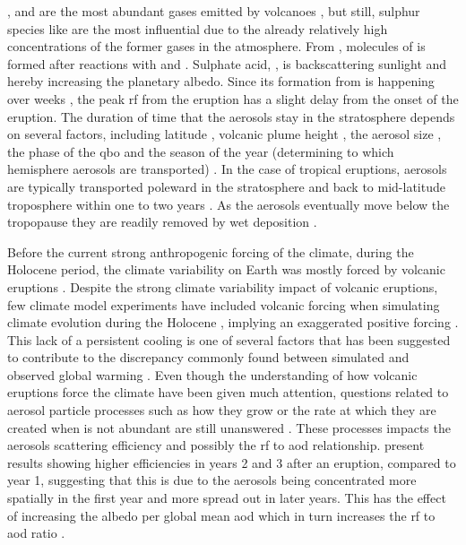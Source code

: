 \documentclass{ametsocV6.1}
\begin{document}
,  and  are the most abundant gases emitted by volcanoes
\citep{robock2000}, but still, sulphur species like  are the most influential
due to the already relatively high concentrations of the former gases in the atmosphere.
From , molecules of  is formed after reactions with  and
 \citep{robock2000}. Sulphate acid, , is backscattering sunlight and
hereby increasing the planetary albedo. Since its formation from  is happening
over weeks \citep{robock2000}, the peak \gls{rf} from the eruption has a slight delay
from the onset of the eruption. The duration of time that the  aerosols stay
in the stratosphere depends on several factors, including latitude \citep{marshall2019,
  toohey2019}, volcanic plume height \citep{marshall2019}, the aerosol size
\citep{marshall2019}, the phase of the \gls{qbo} \citep{pitari2016b} and the season of
the year (determining to which hemisphere aerosols are transported)
\citep{toohey2011,toohey2019}. In the case of tropical eruptions, aerosols are typically
transported poleward in the stratosphere and back to mid-latitude troposphere within one
to two years \citep{robock2000}. As the aerosols eventually move below the tropopause
they are readily removed by wet deposition \citep{liu2012}.

Before the current strong anthropogenic forcing of the climate, during the Holocene
period, the climate variability on Earth was mostly forced by volcanic eruptions
\citep{sigl2022}. Despite the strong climate variability impact of volcanic eruptions,
few climate model experiments have included volcanic forcing when simulating climate
evolution during the Holocene \citep{sigl2022}, implying an exaggerated positive forcing
\citep{gregory2016,solomon2011}. This lack of a persistent cooling is one of several
factors that has been suggested to contribute to the discrepancy commonly found between
simulated and observed global warming \citep{andersson2015}. Even though the
understanding of how volcanic eruptions force the climate have been given much
attention, questions related to aerosol particle processes such as how they grow or the
rate at which they are created when  is not abundant are still unanswered
\citep[e.g.][]{robock2000,zanchettin2019,marshall2020,marshall2022}. These processes
impacts the aerosols scattering efficiency and possibly the \gls{rf} to \gls{aod}
relationship. \citet{marshall2020} present results showing higher efficiencies in years
2 and 3 after an eruption, compared to year 1, suggesting that this is due to the
aerosols being concentrated more spatially in the first year and more spread out in
later years. This has the effect of increasing the albedo per global mean \gls{aod}
which in turn increases the \gls{rf} to \gls{aod} ratio \citep{marshall2020}.
\end{document}
